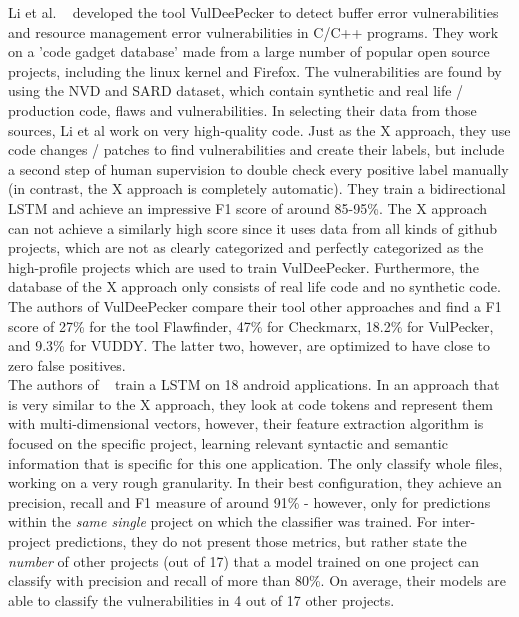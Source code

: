 \documentclass[
	a4paper,
	pagesize,
	pdftex,
	12pt,
	twoside, %
	BCOR=5mm, %
	ngerman,
	fleqn,
	final,
	]{scrartcl}
\begin{document}
Li et al. ~\cite{Li.2018} developed the tool VulDeePecker to detect buffer error vulnerabilities and resource management error vulnerabilities in C/C++ programs. They work on a 'code gadget database' made from a large number of popular open source projects, including the linux kernel and Firefox. The vulnerabilities are found by using the NVD and SARD dataset, which contain synthetic and real life / production code, flaws and vulnerabilities. In selecting their data from those sources, Li et al work on very high-quality code. Just as the X approach, they use code changes / patches to find vulnerabilities and create their labels, but include a second step of human supervision to double check every positive label manually (in contrast, the X approach is completely automatic). They train a bidirectional LSTM and achieve an impressive F1 score of around 85-95\%. The X approach can not achieve a similarly high score since it uses data from all kinds of github projects, which are not as clearly categorized and perfectly categorized as the high-profile projects which are used to train VulDeePecker. Furthermore, the database of the X approach only consists of real life code and no synthetic code.\\

The authors of VulDeePecker compare their tool other approaches and find a F1 score of 27\% for the tool Flawfinder, 47\% for Checkmarx, 18.2\% for VulPecker, and 9.3\% for VUDDY. The latter two, however, are optimized to have close to zero false positives.\\

The authors of ~\cite{Dam.2017} train a LSTM on 18 android applications. In an approach that is very similar to the X approach, they look at code tokens and represent them with multi-dimensional vectors, however, their feature extraction algorithm is focused on the specific project, learning relevant syntactic and semantic information that is specific for this one application. The only classify whole files, working on a very rough granularity. In their best configuration, they achieve an precision, recall and F1 measure of around 91\% - however, only for predictions within the \textit{same single} project on which the classifier was trained. For inter-project predictions, they do not present those metrics, but rather state the \textit{number} of other projects (out of 17) that a model trained on one project can classify with precision and recall of more than 80\%. On average, their models are able to classify the vulnerabilities in 4 out of 17 other projects.\\
\end{document}
